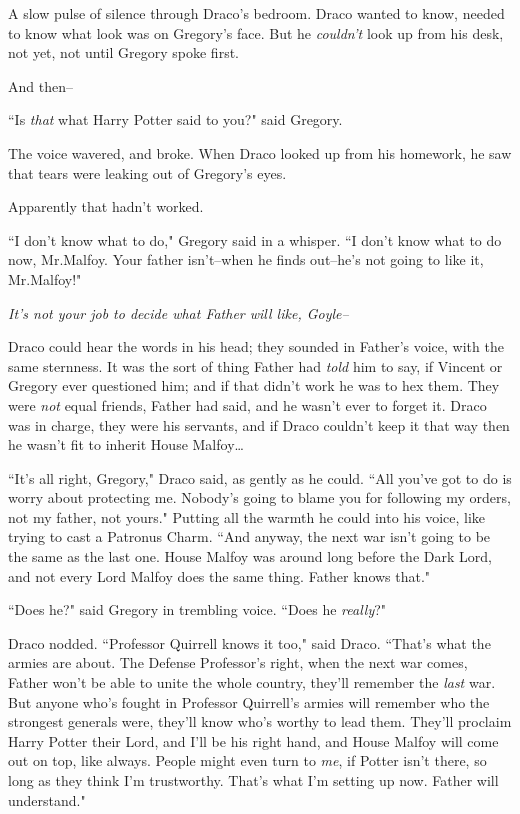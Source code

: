 A slow pulse of silence through Draco's bedroom. Draco wanted to know, needed to know what look was on Gregory's face. But he \emph{couldn't} look up from his desk, not yet, not until Gregory spoke first.

And then\---

``Is \emph{that} what Harry Potter said to you?" said Gregory.

The voice wavered, and broke. When Draco looked up from his homework, he saw that tears were leaking out of Gregory's eyes.

Apparently that hadn't worked.

``I don't know what to do," Gregory said in a whisper. ``I don't know what to do now, Mr.\?Malfoy. Your father isn't\---when he finds out\---he's not going to like it, Mr.\?Malfoy!"

\emph{It's not \emph{your} job to decide what Father will like, Goyle\---}

Draco could hear the words in his head; they sounded in Father's voice, with the same sternness. It was the sort of thing Father had \emph{told} him to say, if Vincent or Gregory ever questioned him; and if that didn't work he was to hex them. They were \emph{not} equal friends, Father had said, and he wasn't ever to forget it. Draco was in charge, they were his servants, and if Draco couldn't keep it that way then he wasn't fit to inherit House Malfoy{\ldots}

``It's all right, Gregory," Draco said, as gently as he could. ``All you've got to do is worry about protecting me. Nobody's going to blame you for following my orders, not my father, not yours." Putting all the warmth he could into his voice, like trying to cast a Patronus Charm. ``And anyway, the next war isn't going to be the same as the last one. House Malfoy was around long before the Dark Lord, and not every Lord Malfoy does the same thing. Father knows that."

``Does he?" said Gregory in trembling voice. ``Does he \emph{really}?"

Draco nodded. ``Professor Quirrell knows it too," said Draco. ``That's what the armies are about. The Defense Professor's right, when the next war comes, Father won't be able to unite the whole country, they'll remember the \emph{last} war. But anyone who's fought in Professor Quirrell's armies will remember who the strongest generals were, they'll know who's worthy to lead them. They'll proclaim Harry Potter their Lord, and I'll be his right hand, and House Malfoy will come out on top, like always. People might even turn to \emph{me}, if Potter isn't there, so long as they think I'm trustworthy. That's what I'm setting up now. Father will understand."

